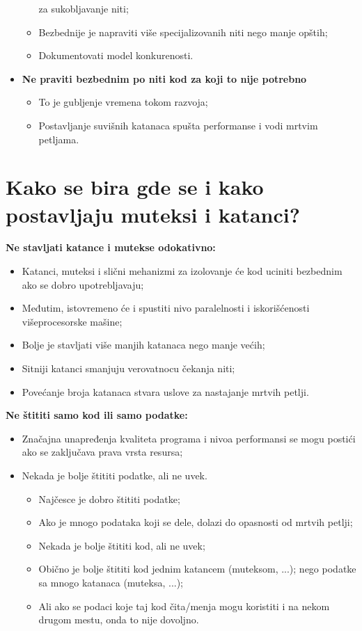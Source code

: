 \documentclass[a4paper]{article}
\begin{document}
\begin{itemize}
\begin{itemize}
                  za sukobljavanje niti;
            \item Bezbednije je napraviti više specijalizovanih niti nego manje opštih;
            \item Dokumentovati model konkurenosti.
          \end{itemize}
    \item \textbf{Ne praviti bezbednim po niti kod za koji to nije potrebno}
          \begin{itemize}
            \item To je gubljenje vremena tokom razvoja;
            \item Postavljanje suvišnih katanaca spušta performanse i vodi mrtvim petljama.
          \end{itemize}
  \end{itemize}
  
\section{Kako se bira gde se i kako postavljaju muteksi i katanci?}
  \noindent \textbf{Ne stavljati katance i mutekse odokativno:}
  \begin{itemize}
    \item Katanci, muteksi i slični mehanizmi za izolovanje će kod uciniti bezbednim ako se 
          dobro upotrebljavaju;
    \item Međutim, istovremeno će i spustiti nivo paralelnosti i iskorišćenosti višeprocesorske mašine; 
    \item Bolje je stavljati više manjih katanaca nego manje većih;
    \item Sitniji katanci smanjuju verovatnocu čekanja niti;
    \item Povećanje broja katanaca stvara uslove za nastajanje mrtvih petlji.
  \end{itemize}
  \textbf{Ne štititi samo kod ili samo podatke:}
  \begin{itemize}
    \item Značajna unapređenja kvaliteta programa i nivoa performansi se mogu postići ako se 
          zaključava prava vrsta resursa;
    \item Nekada je bolje štititi podatke, ali ne uvek.
    \begin{itemize}
      \item Najčesce je dobro štititi podatke;
      \item Ako je mnogo podataka koji se dele, dolazi do opasnosti od mrtvih petlji;
      \item Nekada je bolje štititi kod, ali ne uvek;
      \item Obično je bolje štititi kod jednim katancem (muteksom, ...);
            nego podatke sa mnogo katanaca (muteksa, ...);
      \item Ali ako se podaci koje taj kod čita/menja mogu koristiti i na nekom drugom mestu, 
            onda to nije dovoljno.
    \end{itemize}
  \end{itemize}
  
\end{document}
